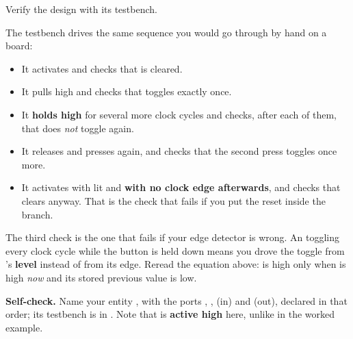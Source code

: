  Verify the design with its testbench.

The testbench drives the same sequence you would go through by hand on a board:
\begin{itemize}
  \item It activates  and checks that  is cleared.
  \item It pulls  high and checks that  toggles exactly once.
  \item It \textbf{holds  high} for several more clock cycles and checks, after each
    of them, that  does \emph{not} toggle again.
  \item It releases and presses again, and checks that the second press toggles  once
    more.
  \item It activates  with  lit and \textbf{with no clock edge afterwards},
    and checks that  clears anyway. That is the check that fails if you put the reset
    inside the  branch.
\end{itemize}

The third check is the one that fails if your edge detector is wrong. An  toggling every
clock cycle while the button is held down means you drove the toggle from 's
\textbf{level} instead of from its edge. Reread the equation above:  is high only when
 is high \emph{now} and its stored previous value is low.


\begin{selfcheck}
\textbf{Self-check.} Name your entity , with the ports ,
,  (in) and  (out), declared in that order; its testbench is in
. Note that  is \textbf{active high} here, unlike in
the worked example.
\end{selfcheck}
